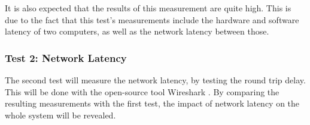 It is also expected that the results of this measurement are quite high. This is due to the fact that this test's measurements include the hardware and software latency of two computers, as well as the network latency between those.

\subsubsection{Test 2: Network Latency}
The second test will measure the network latency, by testing the round trip delay. This will be done with the open-source tool Wireshark \parencite{wireshark}. By comparing the resulting measurements with the first test, the impact of network latency on the whole system will be revealed.